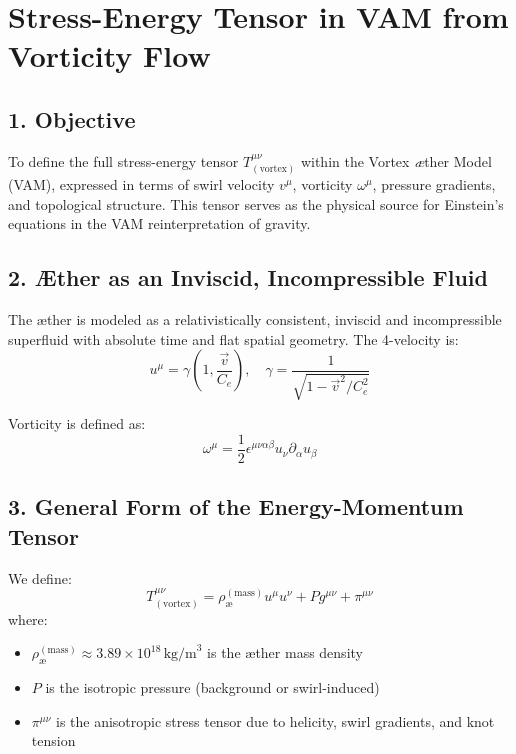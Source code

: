 \documentclass[twocolumn,aps,pre,floatfix,nofootinbib]{revtex4-2}
\begin{document}
    \section*{Stress-Energy Tensor in VAM from Vorticity Flow}

    \subsection*{1. Objective}

    To define the full stress-energy tensor \( T^{\mu\nu}_{(\text{vortex})} \) within the Vortex \textit{\ae}ther Model (VAM), expressed in terms of swirl velocity \( v^\mu \), vorticity \( \omega^\mu \), pressure gradients, and topological structure. This tensor serves as the physical source for Einstein’s equations in the VAM reinterpretation of gravity.

    \subsection*{2. Æther as an Inviscid, Incompressible Fluid}

    The æther is modeled as a relativistically consistent, inviscid and incompressible superfluid with absolute time and flat spatial geometry. The 4-velocity is:
    \begin{equation}
        u^\mu = \gamma \left(1, \frac{\vec{v}}{C_e} \right), \quad \gamma = \frac{1}{\sqrt{1 - \vec{v}^2 / C_e^2}}
    \end{equation}

    Vorticity is defined as:
    \begin{equation}
        \omega^\mu = \frac{1}{2} \epsilon^{\mu\nu\alpha\beta} u_\nu \partial_\alpha u_\beta
    \end{equation}

    \subsection*{3. General Form of the Energy-Momentum Tensor}

    We define:
    \begin{equation}
        T^{\mu\nu}_{(\text{vortex})} = \rho_{\text{\ae}}^{(\text{mass})} u^\mu u^\nu + P g^{\mu\nu} + \pi^{\mu\nu}
    \end{equation}
    where:
    \begin{itemize}
        \item \( \rho_{\text{\ae}}^{(\text{mass})} \approx 3.89 \times 10^{18} \, \text{kg/m}^3 \) is the æther mass density \cite{VAM-1}
        \item \( P \) is the isotropic pressure (background or swirl-induced)
        \item \( \pi^{\mu\nu} \) is the anisotropic stress tensor due to helicity, swirl gradients, and knot tension
    \end{itemize}
\end{document}
